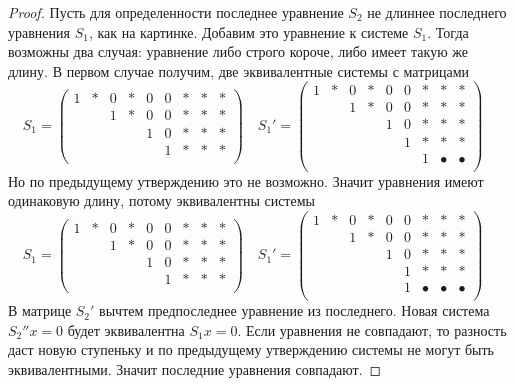 \begin{proof}
Пусть для определенности последнее уравнение $S_2$ не длиннее последнего уравнения $S_1$, как на картинке. Добавим это уравнение к системе $S_1$. Тогда возможны два случая: уравнение либо строго короче, либо имеет такую же длину. В первом случае получим, две эквивалентные системы с матрицами
\[
S_1 = 
\begin{pmatrix}
{1}&{*}&{0}&{*}&{0}&{0}&{*}&{*}&{*}\\
{}&{}&{1}&{*}&{0}&{0}&{*}&{*}&{*}\\
{}&{}&{}&{}&{1}&{0}&{*}&{*}&{*}\\
{}&{}&{}&{}&{}&{1}&{*}&{*}&{*}\\
\end{pmatrix}\quad
S_1' = 
\begin{pmatrix}
{1}&{*}&{0}&{*}&{0}&{0}&{*}&{*}&{*}\\
{}&{}&{1}&{*}&{0}&{0}&{*}&{*}&{*}\\
{}&{}&{}&{}&{1}&{0}&{*}&{*}&{*}\\
{}&{}&{}&{}&{}&{1}&{*}&{*}&{*}\\
{}&{}&{}&{}&{}&{}&{1}&{\bullet}&{\bullet}\\
\end{pmatrix}\quad
\]
Но по предыдущему утверждению это не возможно. Значит уравнения имеют одинаковую длину, потому эквивалентны системы
\[
S_1 = 
\begin{pmatrix}
{1}&{*}&{0}&{*}&{0}&{0}&{*}&{*}&{*}\\
{}&{}&{1}&{*}&{0}&{0}&{*}&{*}&{*}\\
{}&{}&{}&{}&{1}&{0}&{*}&{*}&{*}\\
{}&{}&{}&{}&{}&{1}&{*}&{*}&{*}\\
\end{pmatrix}\quad
S_1' = 
\begin{pmatrix}
{1}&{*}&{0}&{*}&{0}&{0}&{*}&{*}&{*}\\
{}&{}&{1}&{*}&{0}&{0}&{*}&{*}&{*}\\
{}&{}&{}&{}&{1}&{0}&{*}&{*}&{*}\\
{}&{}&{}&{}&{}&{1}&{*}&{*}&{*}\\
{}&{}&{}&{}&{}&{1}&{\bullet}&{\bullet}&{\bullet}\\
\end{pmatrix}\quad
\]
В матрице $S_2'$ вычтем предпоследнее уравнение из последнего. Новая система  $S_2''x=0$ будет эквивалентна $S_1x =0$. Если уравнения не совпадают, то разность даст новую ступеньку и по предыдущему утверждению системы не могут быть эквивалентными. Значит последние уравнения совпадают.


\end{proof}
